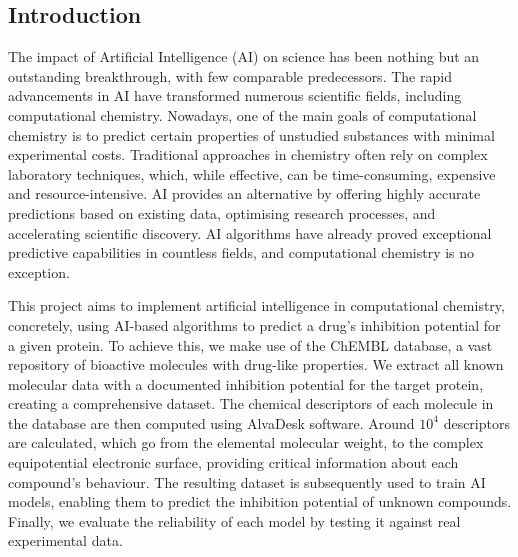 \documentclass[12pt,letterpaper]{article}
\begin{document}
\begin{multicols}{2}[\begin{center}
\begin{abstract}
We explore AI-based algorithms capabilities, specifically the Random Forest model, to predict a drug’s inhibition potential for cyclooxygenase-2 (COX-2), a key protein linked to cancer. Using molecular descriptors extracted from the ChEMBL database, AI models are trained to identify patterns correlating with inhibition potential. The study aims to validate AI’s effectiveness in drug discovery and molecular analysis, demonstrating its potential as a powerful tool in computational chemistry research.
\end{abstract}
\end{center}
]
\section{Introduction}
The impact of Artificial Intelligence (AI) on science has been nothing but an outstanding breakthrough, with few comparable predecessors. The rapid advancements in AI have transformed numerous scientific fields, including computational chemistry. Nowadays, one of the main goals of computational chemistry is to predict certain properties of unstudied substances with minimal experimental costs. Traditional approaches in chemistry often rely on complex laboratory techniques, which, while effective, can be time-consuming, expensive and resource-intensive. AI provides an alternative by offering highly accurate predictions based on existing data, optimising research processes, and accelerating scientific discovery. AI algorithms have already proved exceptional predictive capabilities in countless fields, and computational chemistry is no exception.\par

This project aims to implement artificial intelligence in computational chemistry, concretely, using AI-based algorithms to predict a drug’s inhibition potential for a given protein. To achieve this, we make use of the ChEMBL database, a vast repository of bioactive molecules with drug-like properties. We extract all known molecular data with a documented inhibition potential for the target protein, creating a comprehensive dataset. The chemical descriptors of each molecule in the database are then computed using AlvaDesk software. Around $10^4$ descriptors are calculated, which go from the elemental molecular weight, to the complex equipotential electronic surface, providing critical information about each compound’s behaviour. The resulting dataset is subsequently used to train AI models, enabling them to predict the inhibition potential of unknown compounds. Finally, we evaluate the reliability of each model by testing it against real experimental data. \par


\end{multicols}
\end{document}
